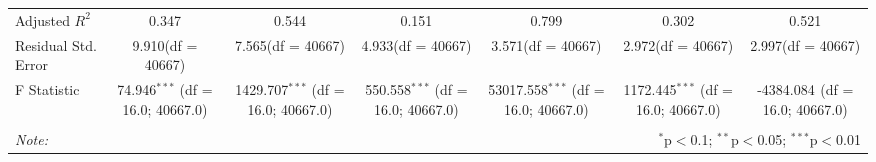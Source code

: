 \begin{table}[!htbp]
\begin{tabular}{@{\extracolsep{5pt}}lcccccc}
 Adjusted $R^2$ & 0.347 & 0.544 & 0.151 & 0.799 & 0.302 & 0.521 \\
 Residual Std. Error & 9.910(df = 40667) & 7.565(df = 40667) & 4.933(df = 40667) & 3.571(df = 40667) & 2.972(df = 40667) & 2.997(df = 40667)  \\
 F Statistic & 74.946$^{***}$ (df = 16.0; 40667.0) & 1429.707$^{***}$ (df = 16.0; 40667.0) & 550.558$^{***}$ (df = 16.0; 40667.0) & 53017.558$^{***}$ (df = 16.0; 40667.0) & 1172.445$^{***}$ (df = 16.0; 40667.0) & -4384.084$^{}$ (df = 16.0; 40667.0) \\
\hline
\hline \\[-1.8ex]
\textit{Note:} & \multicolumn{6}{r}{$^{*}$p$<$0.1; $^{**}$p$<$0.05; $^{***}$p$<$0.01} \\
\end{tabular}
\end{table}
